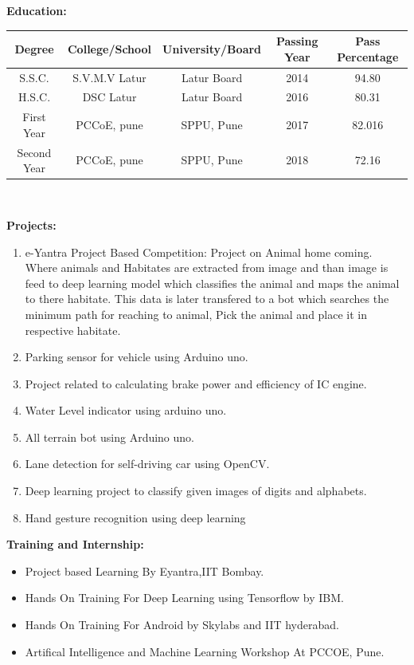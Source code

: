 \documentclass[10pt,twoside,a4paper]{article}
\begin{document}
\noindent
\textbf{Education:}
\begin{center}
\begin{tabular}{|c|c|c|c|c|}
\hline
Degree & College/School & University/Board & Passing Year & Pass Percentage \\
\hline
S.S.C. & S.V.M.V Latur & Latur Board & 2014 & 94.80 \\
\hline
H.S.C. & DSC Latur & Latur Board & 2016 & 80.31 \\
\hline
First Year & PCCoE, pune & SPPU, Pune & 2017 & 82.016 \\
\hline
Second Year & PCCoE, pune & SPPU, Pune & 2018 & 72.16 \\
\hline
\end{tabular}
\\
\end{center}


\noindent
\textbf{Projects:} 
\begin{enumerate}
\item e-Yantra Project Based Competition: Project on Animal home coming. Where animals and Habitates are extracted from image and than image is feed to deep learning model which classifies the animal and maps the animal to there habitate. This data is later transfered to a bot which searches the minimum path for reaching to animal, Pick the animal and place it in respective habitate.
\item Parking sensor for vehicle using Arduino uno.
\item Project related to calculating brake power and efficiency of IC engine.
\item Water Level indicator using arduino uno.
\item All terrain bot using Arduino uno.
\item Lane detection for self-driving car using OpenCV.
\item  Deep learning project to classify given images of digits and alphabets.
\item Hand gesture recognition using deep learning
\\
\end{enumerate}

\noindent
\textbf{Training and Internship:}
\begin{itemize}
\item Project based Learning By Eyantra,IIT Bombay.
\item Hands On Training For Deep Learning using Tensorflow by IBM.
\item Hands On Training For Android by Skylabs and IIT hyderabad.
\item Artifical Intelligence and Machine Learning Workshop At PCCOE, Pune. 
\end{itemize}
\end{document}
